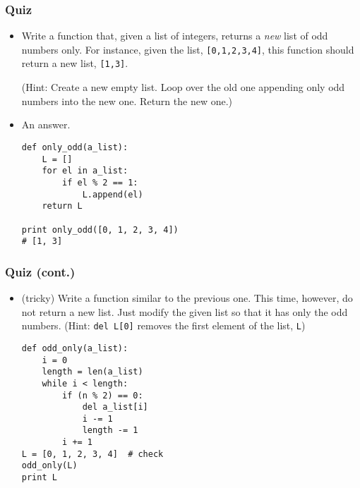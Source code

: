 \documentclass{beamer}
\begin{document}
\begin{frame}[fragile]
\frametitle{Quiz}
\begin{itemize}
\item<1-> Write a function that, given a list
    of integers, returns a \emph{new} list of odd numbers
    only. For instance, given the list, \lstinline{[0,1,2,3,4]},
    this function should return a new list,
    \lstinline{[1,3]}.

    (Hint: Create a new empty list. Loop over the
     old one appending only odd numbers into the new one.
     Return the new one.)
\item<2-> An answer.
\begin{lstlisting}
def only_odd(a_list):
    L = []
    for el in a_list:
        if el % 2 == 1:
            L.append(el)
    return L

print only_odd([0, 1, 2, 3, 4])
# [1, 3]
\end{lstlisting}
\end{itemize}
\end{frame}

\begin{frame}[fragile]
\frametitle{Quiz (cont.)}
\begin{itemize}
\item (tricky) Write a function similar to the previous one.
    This time, however, do not return a new list.
    Just modify the given list so that it has only
    the odd numbers.
    (Hint: \lstinline{del L[0]} removes
    the first element of the list, \lstinline{L})
\begin{lstlisting}
def odd_only(a_list):
    i = 0
    length = len(a_list)
    while i < length:
        if (n % 2) == 0:
            del a_list[i]
            i -= 1
            length -= 1
        i += 1
L = [0, 1, 2, 3, 4]  # check
odd_only(L)
print L
\end{lstlisting}
\end{itemize}
\end{frame}
\end{document}
